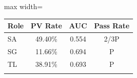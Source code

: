 \begin{table}
  \centering
  
  

  \begin{adjustbox}{max width=\columnwidth}

  \begin{tabular}{lccc}
    \Xhline{2\arrayrulewidth}
    Role & PV Rate &   AUC & Pass Rate \\
    \hline
      SA & 49.40\% & 0.554 & 2/3P      \\
      SG & 11.66\% & 0.694 & P         \\
      TL & 38.91\% & 0.693 & P         \\
    \Xhline{2\arrayrulewidth}
  \end{tabular}
  \end{adjustbox}
\end{table}